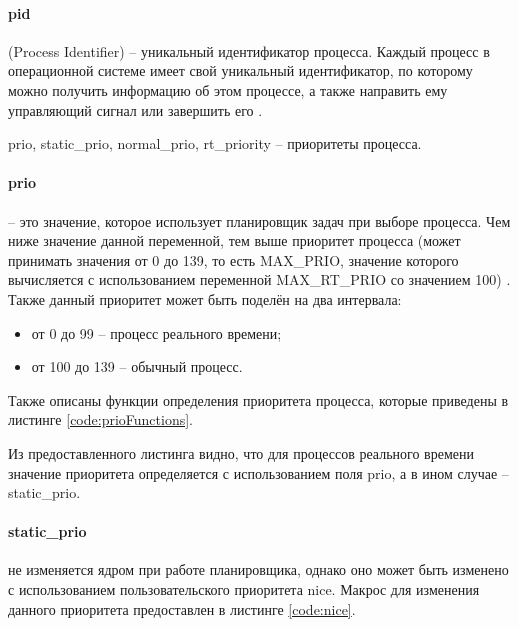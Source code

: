 \paragraph*{pid} (Process Identifier) -- уникальный идентификатор процесса. Каждый процесс в операционной системе имеет свой уникальный идентификатор, по которому можно получить информацию об этом процессе, а также направить ему управляющий сигнал или завершить его \cite{losst}.

prio, static\_prio, normal\_prio, rt\_priority -- приоритеты процесса.

\paragraph*{prio} -- это значение, которое использует планировщик задач при выборе процесса. Чем ниже значение данной переменной, тем выше приоритет процесса (может принимать значения от 0 до 139, то есть MAX\_PRIO, значение которого вычисляется с использованием переменной MAX\_RT\_PRIO со значением 100) \cite{linuxPriority}. Также данный приоритет может быть поделён на два интервала:
\begin{itemize}[leftmargin=1.6\parindent]
\item от 0 до 99 -- процесс реального времени;
\item от 100 до 139 -- обычный процесс.
\end{itemize}

Также описаны функции определения приоритета процесса, которые приведены в листинге \ref{code:prioFunctions}.


Из предоставленного листинга видно, что для процессов реального времени значение приоритета определяется с использованием поля prio, а в ином случае -- static\_prio.

\paragraph*{static\_prio} не изменяется ядром при работе планировщика, однако оно может быть изменено с использованием пользовательского приоритета nice. Макрос для изменения данного приоритета предоставлен в листинге \ref{code:nice}.

